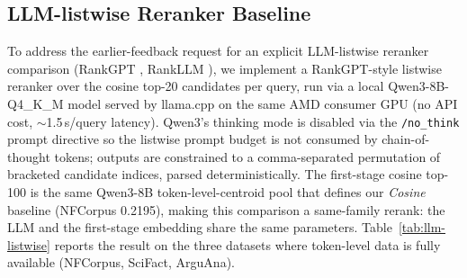 \documentclass[review,1p]{elsarticle}
\begin{document}
\begin{table}[h]
\centering
\small
\caption{Adaptive $\lambda$ strategies across five BEIR corpora, NDCG@10 on the held-out test half (50/50 split, 5-seed mean). Macro is the unweighted mean across the five corpora. Ridge-4 (linear baseline) and GBM-11 (gradient-boosted, 11 features) adds non-linear regression on richer signals (token/lap NDCG margins, lap T-sweep variance, signal disagreement). GBM-11 closes $2.6\times$ of the Ridge-4-to-oracle gap (Ridge-4 gap $13.5\%$ rel; GBM-11 gap $5.17\%$ rel). Oracle is the upper bound from selecting the best $\lambda$ per query a posteriori. Implementation: \texttt{benchmark/adaptive\_fusion\_lambda\_v2.py}; results: \texttt{adaptive\_lambda\_v2\_gbm\_results.json}.}
\label{tab:adaptive-lambda}
\footnotesize
{}
\end{table}

\subsection{LLM-listwise Reranker Baseline}
\label{subsec:llm-listwise}

To address the earlier-feedback request for an explicit LLM-listwise reranker comparison (RankGPT \citep{sun2024rankgpt}, RankLLM \citep{pradeep2025rankllm}), we implement a RankGPT-style listwise reranker over the cosine top-20 candidates per query, run via a local Qwen3-8B-Q4\_K\_M model served by llama.cpp on the same AMD consumer GPU (no API cost, $\sim$1.5\,s/query latency). Qwen3's thinking mode is disabled via the \texttt{/no\_think} prompt directive so the listwise prompt budget is not consumed by chain-of-thought tokens; outputs are constrained to a comma-separated permutation of bracketed candidate indices, parsed deterministically. The first-stage cosine top-100 is the same Qwen3-8B token-level-centroid pool that defines our \emph{Cosine} baseline (NFCorpus 0.2195), making this comparison a same-family rerank: the LLM and the first-stage embedding share the same parameters. Table~\ref{tab:llm-listwise} reports the result on the three datasets where token-level data is fully available (NFCorpus, SciFact, ArguAna).
\end{document}
